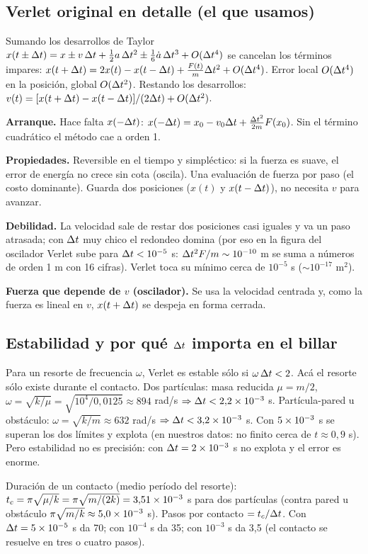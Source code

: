 \documentclass[10.5pt,a4paper]{article}
\begin{document}
\subsection{Verlet original en detalle (el que usamos)}
Sumando los desarrollos de Taylor $x(t\pm\Delta t)=x\pm v\,\Delta t+\tfrac12a\,\Delta t^2\pm\tfrac16\dot a\,\Delta t^3+O(\Delta t^4)$ se cancelan los términos impares:
$x(t+\Delta t)=2x(t)-x(t-\Delta t)+\tfrac{F(t)}{m}\Delta t^2+O(\Delta t^4)$. Error local $O(\Delta t^4)$ en la posición, global $O(\Delta t^2)$. Restando los desarrollos: $v(t)=[x(t+\Delta t)-x(t-\Delta t)]/(2\Delta t)+O(\Delta t^2)$.

\textbf{Arranque.} Hace falta $x(-\Delta t)$: $x(-\Delta t)=x_0-v_0\Delta t+\tfrac{\Delta t^2}{2m}F(x_0)$. Sin el término cuadrático el método cae a orden 1.

\textbf{Propiedades.} Reversible en el tiempo y simpléctico: si la fuerza es suave, el error de energía no crece sin cota (oscila). Una evaluación de fuerza por paso (el costo dominante). Guarda dos posiciones ($x(t)$ y $x(t-\Delta t)$), no necesita $v$ para avanzar.

\textbf{Debilidad.} La velocidad sale de restar dos posiciones casi iguales y va un paso atrasada; con $\Delta t$ muy chico el redondeo domina (por eso en la figura del oscilador Verlet sube para $\Delta t<10^{-5}$ s: $\Delta t^2F/m\sim10^{-10}$ m se suma a números de orden 1 m con 16 cifras). Verlet toca su mínimo cerca de $10^{-5}$ s ($\sim10^{-17}$ m$^2$).

\textbf{Fuerza que depende de $v$ (oscilador).} Se usa la velocidad centrada y, como la fuerza es lineal en $v$, $x(t+\Delta t)$ se despeja en forma cerrada.

\subsection{Estabilidad y por qué $\Delta t$ importa en el billar}
Para un resorte de frecuencia $\omega$, Verlet es estable sólo si $\omega\,\Delta t<2$. Acá el resorte sólo existe durante el contacto. Dos partículas: masa reducida $\mu=m/2$, $\omega=\sqrt{k/\mu}=\sqrt{10^4/0{,}0125}\approx894$ rad/s $\Rightarrow\Delta t<2{,}2\times10^{-3}$ s. Partícula-pared u obstáculo: $\omega=\sqrt{k/m}\approx632$ rad/s $\Rightarrow\Delta t<3{,}2\times10^{-3}$ s. Con $5\times10^{-3}$ s se superan los dos límites y explota (en nuestros datos: no finito cerca de $t\approx0{,}9$ s). Pero estabilidad no es precisión: con $\Delta t=2\times10^{-3}$ s no explota y el error es enorme.

Duración de un contacto (medio período del resorte): $t_c=\pi\sqrt{\mu/k}=\pi\sqrt{m/(2k)}=3{,}51\times10^{-3}$ s para dos partículas (contra pared u obstáculo $\pi\sqrt{m/k}\approx5{,}0\times10^{-3}$ s). Pasos por contacto $=t_c/\Delta t$. Con $\Delta t=5\times10^{-5}$ s da 70; con $10^{-4}$ s da 35; con $10^{-3}$ s da 3,5 (el contacto se resuelve en tres o cuatro pasos).
\end{document}

